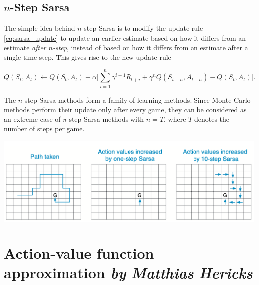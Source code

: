 \subsection{$n$-Step Sarsa}

The simple idea behind $n$-step Sarsa is to modify the update rule \eqref{eq:sarsa_update} to update an earlier estimate based on how it differs from an  estimate \emph{after $n$-step}, instead of based on how it differs from an estimate after a single time step. This gives rise to the new update rule

\begin{equation} \label{eq:n_step_sarsa_update}
	Q(S_t, A_t) \leftarrow Q(S_t, A_t) + \alpha \big[\sum_{i=1}^n \gamma^{i-1}R_{t+i} + \gamma^n Q(S_{t+n}, A_{t+n}) - Q(S_t, A_t)\big].
\end{equation}

The $n$-step Sarsa methods form a family of learning methods. Since Monte Carlo methods perform their update only after every game, they can be considered as an extreme case of $n$-step Sarsa methods with $n = T$, where $T$ denotes the number of steps per game. 

\begin{center}
\includegraphics[scale=0.5]{graphics/n_step_sarsa.png}
\end{center}




\section[Action-value function approximation]{Action-value function approximation \hfill \small \normalfont\textit{by Matthias Hericks}}







